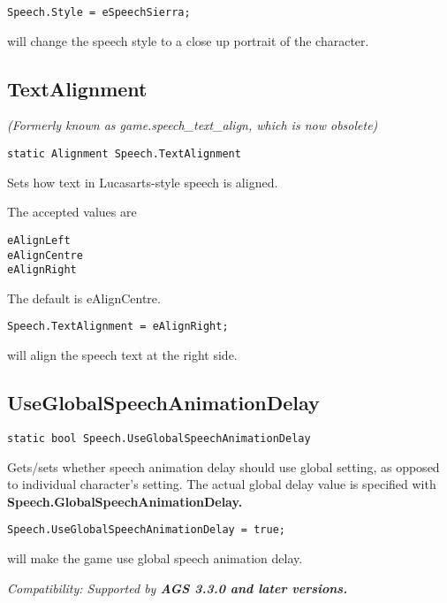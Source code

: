 \begin{verbatim}
Speech.Style = eSpeechSierra;
\end{verbatim}
will change the speech style to a close up portrait of the character.


\subsection{TextAlignment}\label{Speech.TextAlignment}%

\it{(Formerly known as game.speech_text_align, which is now obsolete)}

\begin{verbatim}
static Alignment Speech.TextAlignment
\end{verbatim}

Sets how text in Lucasarts-style speech is aligned.

The accepted values are
\begin{verbatim}
eAlignLeft
eAlignCentre
eAlignRight
\end{verbatim}
The default is eAlignCentre.

\begin{verbatim}
Speech.TextAlignment = eAlignRight;
\end{verbatim}
will align the speech text at the right side.


\subsection{UseGlobalSpeechAnimationDelay}\label{Speech.UseGlobalSpeechAnimationDelay}%

\begin{verbatim}
static bool Speech.UseGlobalSpeechAnimationDelay
\end{verbatim}

Gets/sets whether speech animation delay should use global setting, as opposed to individual character's setting.
The actual global delay value is specified with \bf{Speech.GlobalSpeechAnimationDelay}.

\begin{verbatim}
Speech.UseGlobalSpeechAnimationDelay = true;
\end{verbatim}
will make the game use global speech animation delay.

\it{Compatibility:} Supported by \bf{AGS 3.3.0} and later versions.

